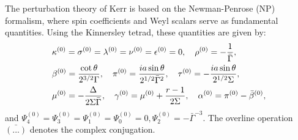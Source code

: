 \documentclass[aps,prd,amsmath,floats,floatfix, twocolumn,
superscriptaddress,nofootinbib,showpacs]{revtex4-1}
\begin{document}
The perturbation theory of Kerr is based on the Newman-Penrose (NP) formalism, where spin coefficients and Weyl scalars serve as fundamental quantities. Using the Kinnersley tetrad, these quantities are given by:
\begin{align}
    &\kappa^{(0)}=\sigma^{(0)}=\lambda^{(0)}=\nu^{(0)}=\epsilon^{(0)}=0, \quad \rho^{(0)}=-\frac{1}{\bar{\Gamma}}, \notag \\
    &\beta^{(0)}=\frac{\cot\theta}{2^{3/2}\Gamma},\quad \pi^{(0)}=\frac{ia\sin\theta}{2^{1/2}\bar{\Gamma}^2}, \quad \tau^{(0)}=-\frac{ia\sin\theta}{2^{1/2}\Sigma}, \notag  \\ 
    &\mu^{(0)}=-\frac{\Delta}{2\Sigma\bar{\Gamma}}, \quad \gamma^{(0)}=\mu^{(0)}+\frac{r-1}{2\Sigma}, \quad \alpha^{(0)}=\pi^{(0)}-\bar{\beta}^{(0)}, \label{eq:NP_spin_coefficients}
\end{align}
and $\Psi_4^{(0)}=\Psi_3^{(0)}=\Psi_1^{(0)}=\Psi_0^{(0)}=0, \Psi_2^{(0)}=-\bar{\Gamma}^{-3}$. The overline operation $\bar{(...)}$ denotes the complex conjugation.
\end{document}
